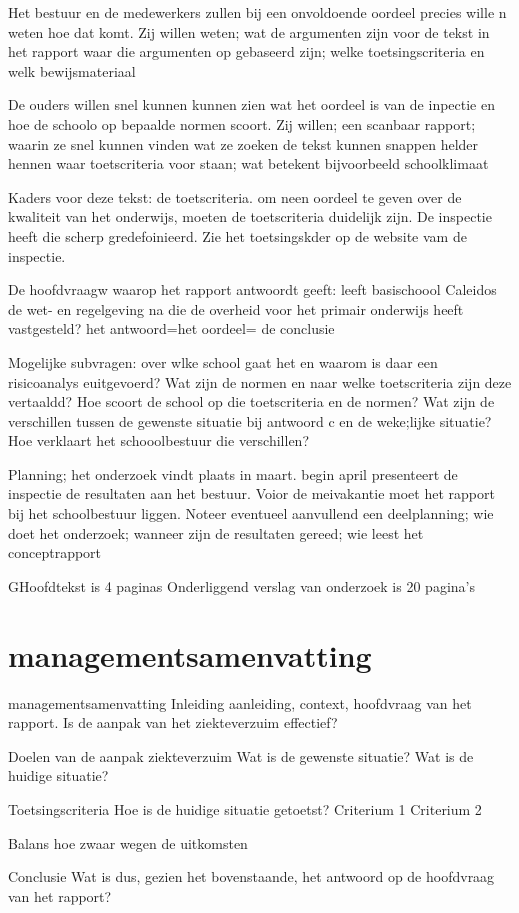 \documentclass[11pt]{report} %
\begin{document}
Het bestuur en de medewerkers zullen bij een onvoldoende oordeel precies wille n weten hoe dat komt. Zij willen weten;
wat de  argumenten zijn voor de tekst in het rapport
waar die argumenten op gebaseerd zijn; welke toetsingscriteria en welk bewijsmateriaal


De ouders willen snel kunnen kunnen zien wat het oordeel is van de inpectie en hoe de schoolo op bepaalde normen scoort. Zij willen;
een scanbaar rapport; waarin ze snel kunnen vinden wat ze zoeken
de tekst kunnen snappen
helder hennen waar toetscriteria voor staan; wat betekent bijvoorbeeld schoolklimaat


Kaders voor deze tekst: de toetscriteria. om neen oordeel te geven over de kwaliteit van het onderwijs, moeten de toetscriteria duidelijk zijn. De inspectie heeft die scherp gredefoinieerd. Zie het toetsingskder op de website vam de inspectie.

De hoofdvraagw waarop het rapport antwoordt geeft: leeft basischoool Caleidos de wet- en regelgeving na die de overheid voor het primair onderwijs heeft vastgesteld? het antwoord=het oordeel= de conclusie


Mogelijke subvragen:
over wlke school gaat het en waarom is daar een risicoanalys euitgevoerd?
Wat zijn de normen en naar welke toetscriteria zijn deze vertaaldd?
Hoe scoort de school op die toetscriteria en de normen?
Wat zijn de verschillen tussen de gewenste situatie bij antwoord c en de weke;lijke situatie?
Hoe  verklaart het schooolbestuur die verschillen?

Planning;
het onderzoek vindt plaats in maart. begin april presenteert de inspectie de resultaten aan het bestuur. Voior de meivakantie moet  het rapport bij het schoolbestuur liggen. Noteer eventueel aanvullend een deelplanning; wie doet het onderzoek; wanneer zijn de resultaten gereed; wie leest het conceptrapport

GHoofdtekst is 4 paginas
Onderliggend verslag van onderzoek is 20 pagina's




\chapter{managementsamenvatting}
managementsamenvatting
Inleiding
aanleiding, context, hoofdvraag van het rapport. Is de aanpak van het ziekteverzuim effectief?

Doelen van de aanpak ziekteverzuim
Wat is de gewenste situatie?
Wat is de huidige situatie?

Toetsingscriteria
Hoe is de huidige situatie getoetst?
Criterium 1
Criterium 2

Balans 
hoe zwaar wegen de uitkomsten

Conclusie
Wat is dus, gezien  het bovenstaande, het antwoord op de hoofdvraag van het rapport?
\end{document}
